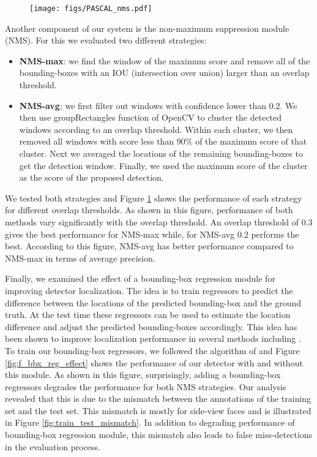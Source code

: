 \documentclass{sig-alternate-2013}
\begin{document}
\begin{figure}[t]
  \centering
    \texttt{[image: figs/PASCAL\_nms.pdf]}
  \caption{}
  \label{fig:f_nms_effect}
\end{figure}

Another component of our system is the non-maximum suppression module (NMS). For this we evaluated two different strategies: 
\begin{itemize}
\item{\textbf{NMS-max}: we find the window of the maximum score and remove all of the bounding-boxes with an IOU (intersection over union) larger than an overlap threshold.} 
\item{\textbf{NMS-avg}: we first filter out windows with confidence lower than $0.2$. We then use groupRectangles function of OpenCV to cluster the detected windows according to an overlap threshold. Within each cluster, we then removed all windows with score less than $90\%$ of the maximum score of that cluster. Next we averaged the locations of the remaining bounding-boxes to get the detection window. Finally, we used the maximum score of the cluster as the score of the proposed detection.} 
\end{itemize}
We tested both strategies and Figure \ref{fig:f_nms_effect} shows the performance of each strategy for different overlap thresholds. As shown in this figure, performance of both methods vary significantly with the overlap threshold. An overlap threshold of $0.3$ gives the best performance for NMS-max while, for NMS-avg $0.2$ performs the best. According to this figure, NMS-avg has better performance compared to NMS-max in terms of average precision. 

Finally, we examined the effect of a bounding-box regression module for improving detector localization. The idea is to train regressors to predict the difference between the locations of the predicted bounding-box and the ground truth. At the test time these regressors can be used to estimate the location difference and adjust the predicted bounding-boxes accordingly. This idea has been shown to improve localization performance in several methods including \cite{dpm, overfeat, multi_box}. To train our bounding-box regressors, we followed the algorithm of \cite{rcnn} and Figure \ref{fig:f_bbx_reg_effect} shows the performance of our detector with and without this module. As shown in this figure, surprisingly, adding a bounding-box regressors degrades the performance for both NMS strategies. Our analysis revealed that this is due to the mismatch between the annotations of the training set and the test set. This mismatch is mostly for side-view faces and is illustrated in Figure \ref{fig:train_test_mismatch}. In addition to degrading performance of bounding-box regression module, this mismatch also leads to false miss-detections in the evaluation process.
\end{document}

